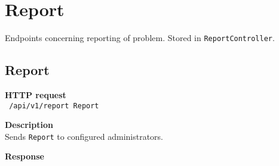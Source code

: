 \section{Report}
Endpoints concerning reporting of problem. Stored in \texttt{ReportController}.

\subsection{Report}
\begin{description}
    \item \textbf{HTTP request}\\
        \texttt{\text{[POST]} /api/v1/report \texttt{Report}}
    \item \textbf{Description}\\
        Sends \texttt{Report} to configured administrators.
    \item \textbf{Response}\\
        \texttt{\text{[200 OK]}}
\end{description}